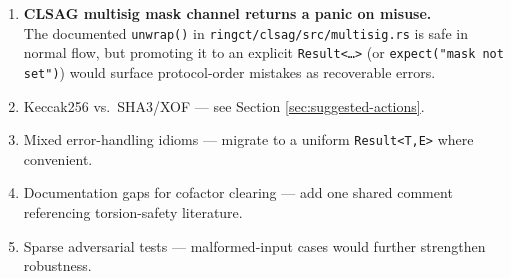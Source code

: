 \documentclass[12pt,a4paper]{article}
\begin{document}
\begin{enumerate}[label=\textbf{\arabic*.}]
  \item \textbf{CLSAG multisig mask channel returns a panic on misuse.}\\
        The documented \texttt{unwrap()} in
        \texttt{ringct/clsag/src/multisig.rs} is safe in normal flow,
        but promoting it to an explicit
        \texttt{Result<…>} (or \texttt{expect("mask not set")})
        would surface protocol-order mistakes as recoverable errors.
%
%
  \item Keccak256 vs.\ SHA3/XOF — see Section \ref{sec:suggested-actions}.
  \item Mixed error-handling idioms — migrate to a uniform
        \texttt{Result<T,E>} where convenient.
  \item Documentation gaps for cofactor clearing — add one shared
        comment referencing torsion-safety literature.
  \item Sparse adversarial tests — malformed-input cases would further
        strengthen robustness.
\end{enumerate}
\end{document}
